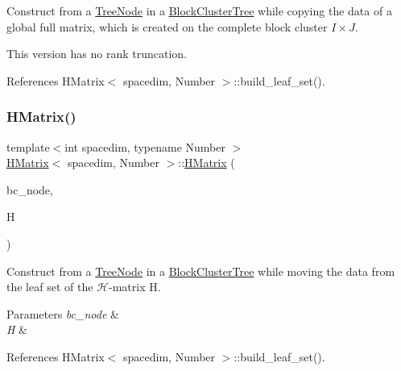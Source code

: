 Construct from a \hyperlink{classTreeNode}{Tree\+Node} in a \hyperlink{classBlockClusterTree}{Block\+Cluster\+Tree} while copying the data of a global full matrix, which is created on the complete block cluster $I \times J$.

This version has no rank truncation. 

References H\+Matrix$<$ spacedim, Number $>$\+::build\+\_\+leaf\+\_\+set().

\mbox{\label{classHMatrix_abeb8d0add9bffecafc12f4c6b1dcab8e}} 
\subsubsection{\texorpdfstring{H\+Matrix()}{HMatrix()}\hspace{0.1cm}{\footnotesize\ttfamily [8/11]}}
{\footnotesize\ttfamily template$<$int spacedim, typename Number $>$ \\
\hyperlink{classHMatrix}{H\+Matrix}$<$ spacedim, Number $>$\+::\hyperlink{classHMatrix}{H\+Matrix} (\begin{DoxyParamCaption}\item[{typename \hyperlink{classBlockClusterTree}{Block\+Cluster\+Tree}$<$ spacedim, Number $>$\+::node\+\_\+const\+\_\+pointer\+\_\+type}]{bc\+\_\+node,  }\item[{\hyperlink{classHMatrix}{H\+Matrix}$<$ spacedim, Number $>$ \&\&}]{H }\end{DoxyParamCaption})}

Construct from a {\ttfamily \hyperlink{classTreeNode}{Tree\+Node}} in a {\ttfamily \hyperlink{classBlockClusterTree}{Block\+Cluster\+Tree}} while moving the data from the leaf set of the $\mathcal{H}$-\/matrix {\ttfamily H}.


\begin{DoxyParams}{Parameters}
{\em bc\+\_\+node} & \\
\hline
{\em H} & \\
\hline
\end{DoxyParams}


References H\+Matrix$<$ spacedim, Number $>$\+::build\+\_\+leaf\+\_\+set().

\mbox{\label{classHMatrix_a78aa967d7a99e27cc172f0db3791306b}} 
